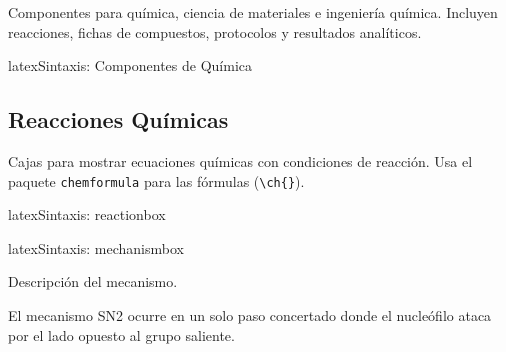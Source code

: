 Componentes para química, ciencia de materiales e ingeniería química.
Incluyen reacciones, fichas de compuestos, protocolos y resultados analíticos.

\begin{codigosimple}{latex}{Sintaxis: Componentes de Química}
\usepackage[quimica]{eps-componentes}
\end{codigosimple}

\subsection{Reacciones Químicas}
\label{subsec:reacciones}

Cajas para mostrar ecuaciones químicas con condiciones de reacción.
Usa el paquete \texttt{chemformula} para las fórmulas (\verb|\ch{}|).


\begin{codigosimple}{latex}{Sintaxis: reactionbox}
\begin{reactionbox}[Título]
\end{reactionbox}
\end{codigosimple}

\begin{reactionbox}

\end{reactionbox}


\begin{codigosimple}{latex}{Sintaxis: mechanismbox}
\begin{mechanismbox}[Título]
  Descripción del mecanismo.
\end{mechanismbox}
\end{codigosimple}

\begin{mechanismbox}
  El mecanismo SN2 ocurre en un solo paso concertado donde el nucleófilo
  ataca por el lado opuesto al grupo saliente.

\end{mechanismbox}

